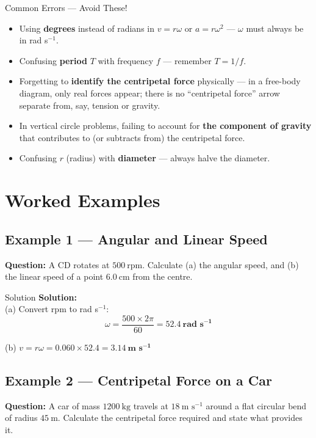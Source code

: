 \begin{warningbox}{Common Errors — Avoid These!}
\begin{itemize}[itemsep=3pt]
  \item Using \textbf{degrees} instead of radians in $v = r\omega$ or $a = r\omega^2$ — $\omega$ must always be in rad s$^{-1}$.
  \item Confusing \textbf{period} $T$ with frequency $f$ — remember $T = 1/f$.
  \item Forgetting to \textbf{identify the centripetal force} physically — in a free-body diagram, only real forces appear; there is no ``centripetal force'' arrow separate from, say, tension or gravity.
  \item In vertical circle problems, failing to account for \textbf{the component of gravity} that contributes to (or subtracts from) the centripetal force.
  \item Confusing \textbf{$r$} (radius) with \textbf{diameter} — always halve the diameter.
\end{itemize}
\end{warningbox}

\section{Worked Examples}

\subsection*{Example 1 — Angular and Linear Speed}

\textbf{Question:} A CD rotates at $500\ \text{rpm}$. Calculate (a) the angular speed, and (b) the linear speed of a point $6.0\ \text{cm}$ from the centre.

\begin{examplebox}{Solution}
\textbf{Solution:}\\
(a) Convert rpm to rad s$^{-1}$:
$$\omega = \frac{500 \times 2\pi}{60} = \mathbf{52.4\ \text{rad s}^{-1}}$$

(b) $v = r\omega = 0.060 \times 52.4 = \mathbf{3.14\ \text{m s}^{-1}}$
\end{examplebox}

\subsection*{Example 2 — Centripetal Force on a Car}

\textbf{Question:} A car of mass $1200\ \text{kg}$ travels at $18\ \text{m s}^{-1}$ around a flat circular bend of radius $45\ \text{m}$. Calculate the centripetal force required and state what provides it.

